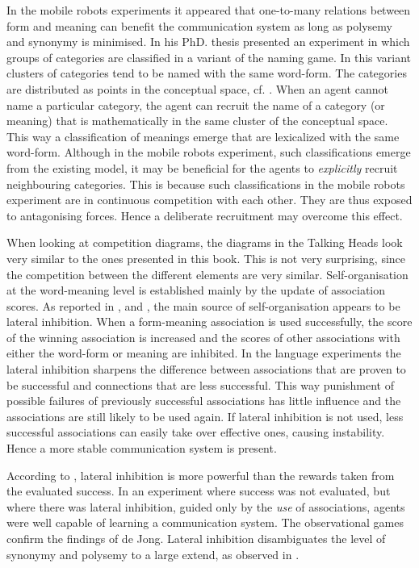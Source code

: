 In the mobile robots experiments it appeared that one-to-many relations between form and meaning can benefit the communication system as long as polysemy and synonymy is minimised. In his PhD. thesis \citet{kaplan:2000} presented an experiment in which groups of categories are classified in a variant of the naming game. In this variant clusters of categories tend to be named with the same word-form. The categories are distributed as points in the {\sc conceptual space}, cf. \citet{gardenfors:1996}. When an agent cannot name a particular category, the agent can recruit the name of a category (or meaning) that is mathematically in the same cluster of the conceptual space. This way a classification of meanings emerge that are lexicalized with the same word-form. Although in the mobile robots experiment, such classifications emerge from the existing model, it may be beneficial for the agents to {\em explicitly} recruit neighbouring categories. This is because such classifications in the mobile robots experiment are in continuous competition with each other. They are thus exposed to antagonising forces. Hence a deliberate recruitment may overcome this effect.



When looking at competition diagrams, the diagrams in the Talking Heads look very similar to the ones presented in this book. This is not very surprising, since the competition between the different elements are very similar. Self-organisation at the word-meaning level is established mainly by the update of association scores. As reported in \citet{steels:2000}, \citet{dejong:2000} and \citet{kaplan:2000}, the main source of self-organisation appears to be lateral inhibition. When a form-meaning association is used successfully, the score of the winning association is increased and the scores of other associations with either the word-form or meaning are inhibited. In the language experiments the lateral inhibition sharpens the difference between associations that are proven to be successful and connections that are less successful. This way punishment of possible failures of previously successful associations has little influence and the associations are still likely to be used again. If lateral inhibition is not used, less successful associations can easily take over effective ones, causing instability. Hence a more stable communication system is present.

\enlargethispage{1\baselineskip}
According to \citet{dejong:2000}, lateral inhibition is more powerful than the rewards taken from the evaluated success. In an experiment where success was not evaluated, but where there was lateral inhibition, guided only by the {\em use} of associations, agents were well capable of learning a communication system. The observational games confirm the findings of de Jong. Lateral inhibition disambiguates the level of synonymy and polysemy to a large extend, as observed in .

